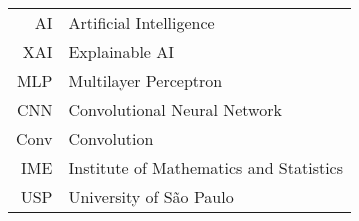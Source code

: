\documentclass[a4paper,12pt,twoside,brazilian,english]{book}
\begin{document}
\begin{tabular}{rl}
   AI  & Artificial Intelligence \\
   XAI & Explainable AI \\
   MLP & Multilayer Perceptron \\
   CNN & Convolutional Neural Network \\
   Conv & Convolution \\
   IME & Institute of Mathematics and Statistics\\
   USP & University of São Paulo
\end{tabular}

\clearpage


\disablenewpage{\listoffigures}

\disablenewpage{\listoftables}


\tableofcontents

\egroup %


\mainmatter

\pagestyle{mainmatter}

\singlespacing

\pagestyle{unnumberedchapter}






\cleardoublepage

\pagestyle{appendix}

\appendix

\addappheadtotoc
\end{document}

